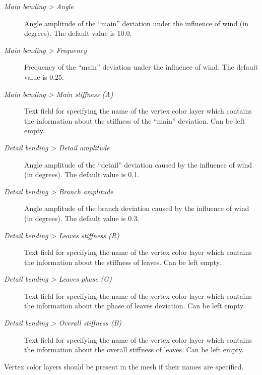 \documentclass[a4paper,12pt,oneside]{sphinxmanual}
\begin{document}
\begin{DUlineblock}{0em}
\item[] 
\end{DUlineblock}
\begin{description}
\item[{\emph{Main bending \textgreater{} Angle}}] \leavevmode
Angle amplitude of the ``main'' deviation under the influence of wind (in degrees). The default value is 10.0.

\item[{\emph{Main bending \textgreater{} Frequency}}] \leavevmode
Frequency of the ``main'' deviation under the influence of wind. The default value is 0.25.

\item[{\emph{Main bending \textgreater{} Main stiffness (A)}}] \leavevmode
Text field for specifying the name of the vertex color layer which contains the information about the stiffness of the ``main'' deviation. Can be left empty.

\item[{\emph{Detail bending \textgreater{} Detail amplitude}}] \leavevmode
Angle amplitude of the ``detail'' deviation caused by the influence of wind (in degrees). The default value is 0.1.

\item[{\emph{Detail bending \textgreater{} Branch amplitude}}] \leavevmode
Angle amplitude of the branch deviation caused by the influence of wind (in degrees). The default value is 0.3.

\item[{\emph{Detail bending \textgreater{} Leaves stiffness (R)}}] \leavevmode
Text field for specifying the name of the vertex color layer which contains the information about the stiffness of leaves. Can be left empty.

\item[{\emph{Detail bending \textgreater{} Leaves phase (G)}}] \leavevmode
Text field for specifying the name of the vertex color layer which contains the information about the phase of leaves deviation. Can be left empty.

\item[{\emph{Detail bending \textgreater{} Overall stiffness (B)}}] \leavevmode
Text field for specifying the name of the vertex color layer which contains the information about the overall stiffness of leaves. Can be left empty.

\end{description}

Vertex color layers should be present in the mesh if their names are specified.
\end{document}
